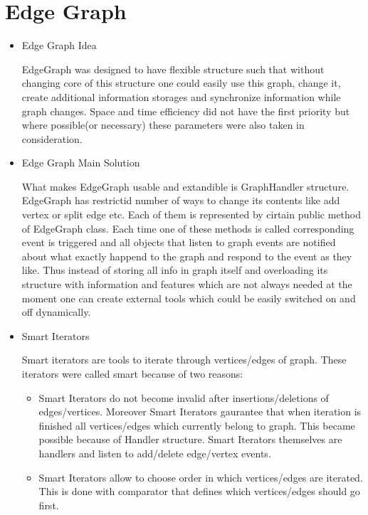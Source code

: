 \documentclass[14pt]{article}
\begin{document}
\section{Edge Graph}
\begin{itemize}
\item Edge Graph Idea

EdgeGraph was designed to have flexible structure such that without changing core of this structure one could easily use this graph, change it, create additional information storages and synchronize information while graph changes. Space and time efficiency did not have the first priority but where possible(or necessary) these parameters were also taken in consideration.

\item Edge Graph Main Solution

What makes EdgeGraph usable and extandible is GraphHandler structure. EdgeGraph has restrictid number of ways to change its contents like add vertex or split edge etc. Each of them is represented by cirtain public method of EdgeGraph class. Each time one of these methods is called corresponding event is triggered and all objects that listen to graph events are notified about what exactly happend to the graph and respond to the event as they like. Thus instead of storing all info in graph itself and overloading its structure with information and features which are not always needed at the moment one can create external tools which could be easily switched on and off dynamically.

\item Smart Iterators

Smart iterators are tools to iterate through vertices/edges of graph. These iterators were called smart because of two reasons:
\begin{itemize}
\item Smart Iterators do not become invalid after insertions/deletions of edges/vertices. Moreover Smart Iterators gaurantee that when iteration is finished all vertices/edges which currently belong to graph. This became possible because of Handler structure. Smart Iterators themselves are handlers and listen to add/delete edge/vertex events.
\item Smart Iterators allow to choose order in which vertices/edges are iterated. This is done with comparator that defines which vertices/edges should go first.
\end{itemize}

\end{itemize}
\end{document}
